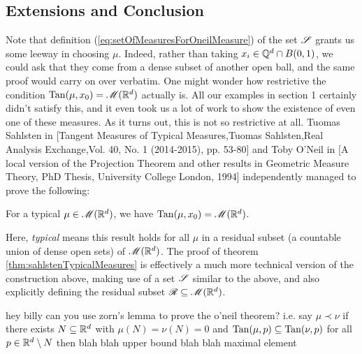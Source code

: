 \subsection{Extensions and Conclusion}
Note that definition (\ref{eq:setOfMeasuresForOneilMeasure}) of the set $\mathscr{S}$ grants us some leeway in choosing $\mu$. Indeed, rather than taking $x_i \in \mathbb{Q}^d \cap B(0,1)$, we could ask that they come from a dense subset of another open ball, and the same proof would carry on over verbatim. One might wonder how restrictive the condition $\operatorname{Tan}(\mu,x_0) = \mathscr{M}(\mathbb{R}^d)$ actually is. All our examples in section 1 certainly didn't satisfy this, and it even took us a lot of work to show the existence of even one of these measures. As it turns out, this is not so restrictive at all. Tuomas Sahlsten in [Tangent Measures of Typical Measures,Tuomas Sahlsten,Real Analysis Exchange,Vol. 40, No. 1 (2014-2015), pp. 53-80] and Toby O'Neil in [A local version of the Projection Theorem and other results in Geometric Measure Theory,
PhD Thesis, University College London, 1994] independently managed to prove the following:
\begin{theorem} \label{thm:sahlstenTypicalMeasures}
    For a typical $\mu \in \mathscr{M}(\mathbb{R}^d)$, we have $\operatorname{Tan}(\mu,x_0) = \mathscr{M}(\mathbb{R}^d)$.
\end{theorem}
Here, \textit{typical} means this result holds for all $\mu$ in a residual subset (a countable union of dense open sets) of $\mathscr{M}(\mathbb{R}^d)$. The proof of theorem \ref{thm:sahlstenTypicalMeasures} is effectively a much more technical version of the construction above, making use of a set $\mathscr{S}$ similar to the above, and also explicitly defining the residual subset $\mathscr{R} \subseteq \mathscr{M}(\mathbb{R}^d)$.

{\color{red} hey billy can you use zorn's lemma to prove the o'neil theorem? i.e. say $\mu \prec \nu$ if there exists $N \subseteq \mathbb{R}^d$ with $\mu(N) = \nu(N) = 0$ and $\operatorname{Tan}(\mu,p) \subseteq \operatorname{Tan}(\nu,p)$ for all $p \in \mathbb{R}^d \setminus N$ then blah blah upper bound blah blah maximal element}